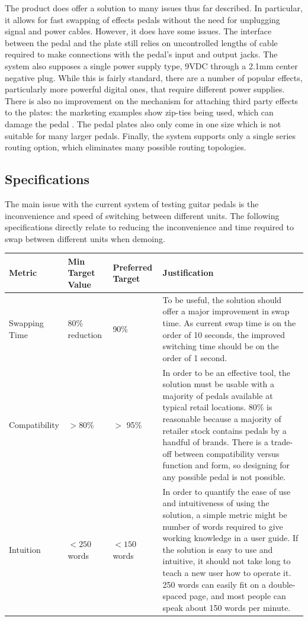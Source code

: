 \documentclass{article}
\begin{document}
		The product does offer a solution to many issues thus far described.  In particular, it allows for fast swapping of effects pedals without the need for unplugging signal and power cables.  However, it does have some issues.  The interface between the pedal and the plate still relies on uncontrolled lengths of cable required to make connections with the pedal's input and output jacks.  The system also supposes a single power supply type, 9VDC through a 2.1mm center negative plug.  While this is fairly standard, there are a number of popular effects, particularly more powerful digital ones, that require different power supplies.  There is also no improvement on the mechanism for attaching third party effects to the plates: the marketing examples show zip-ties being used, which can damage the pedal \cite{conNEXI}.  The pedal plates also only come in one size which is not suitable for many larger pedals.  Finally, the system supports only a single series routing option, which eliminates many possible routing topologies.

	\color{black}

	\subsection{Specifications}
	The main issue with the current system of testing guitar pedals is the inconvenience and speed of switching between different units.  The following specifications directly relate to reducing the inconvenience and time required to swap between different units when demoing.

	\begin{center}
	\renewcommand{\arraystretch}{1.5}
	\begin{tabular}{|l|l|l|p{6cm}|}
		\hline
		Metric & Min Target Value & Preferred Target & Justification \\
		\hline
		Swapping Time & 80\% reduction & 90\% & To be useful, the solution should offer a major improvement in swap time.  As current swap time is on the order of 10 seconds, the improved switching time should be on the order of 1 second.\\
		Compatibility &  $>$80\% & $>$ 95\% & In order to be an effective tool, the solution must be usable with a majority of pedals available at typical retail locations.  80\% is reasonable because a majority of retailer stock contains pedals by a handful of brands.  There is a trade-off between compatibility versus function and form, so designing for any possible pedal is not possible. \\
		Intuition & $< 250$ words& $< 150$ words & In order to quantify the ease of use and intuitiveness of using the solution, a simple metric might be number of words required to give working knowledge in a user guide.  If the solution is easy to use and intuitive, it should not take long to teach a new user how to operate it.  250 words can easily fit on a double-spaced page, and most people can speak about 150 words per minute. \\
		\hline
	\end{tabular}
	\end{center}
\end{document}
